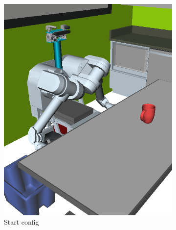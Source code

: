 {
\setlength{\offsetpage}{0.5in}
\begin{figure}
\begin{widepage}
\centering

   \begin{subfigure}[t]{0.19\linewidth}
      \centering
      \includegraphics[width=\columnwidth]{figs/testherb-a.png}
      \caption{Start config}
   \end{subfigure}
   \begin{subfigure}[t]{0.19\linewidth}
      \centering

\end{subfigure}
\end{widepage}
\end{figure}}
